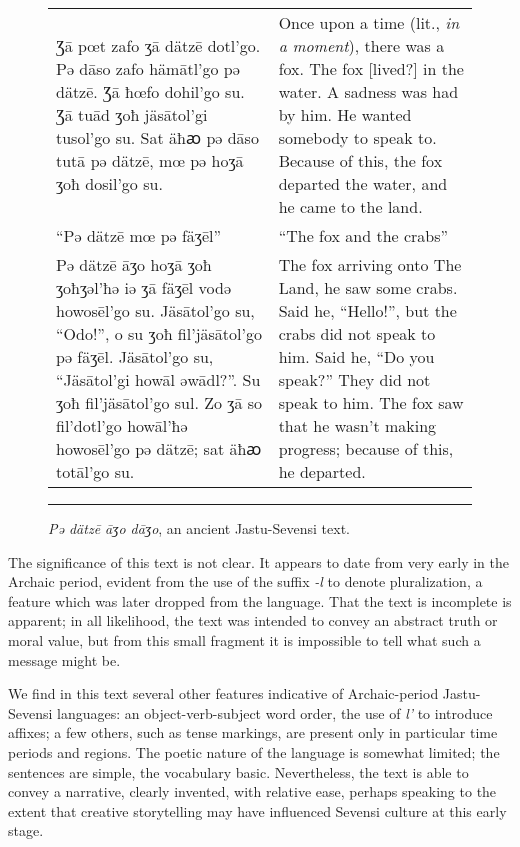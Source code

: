 \begin{figure}[ht]

\centering\small

\begin{tabular}{p{200pt}p{200pt}}
{\raggedleft Ʒā pœt zafo ʒā dätzē dotl’go.
Pǝ dāso zafo hämātl’go pǝ dätzē.
Ʒā ħœfo dohil'go su.
Ʒā tuād ʒoħ jäsātol’gi tusol’go su.
Sat äħꜵ pǝ dāso tutā pǝ dätzē, mœ pǝ hoʒā ʒoħ dosil’go su.\par}
&{\raggedright Once upon a time (lit., \emph{in a moment}), there was a fox.
The fox [lived?] in the water.
A sadness was had by him.
He wanted somebody to speak to.
Because of this, the fox departed the water, and he came to the land.\par}
\\{\raggedleft “Pə dätzē mœ pə fäʒēl”\par}
&{\raggedright “The fox and the crabs”\par}
\\{\raggedleft Pə dätzē āʒo hoʒā ʒoħ ʒoħʒəl'ħə iə ʒā fäʒēl vodə howosēl'go su.
Jäsātol'go su, “Odo!”, o su ʒoħ fil'jäsātol'go pə fäʒēl.
Jäsātol'go su, “Jäsātol'gi howāl əwādl?”.
Su ʒoħ fil'jäsātol'go sul.
Zo ʒā so fil'dotl'go howāl'ħə howosēl'go pə dätzē; sat äħꜵ totāl'go su.\par}
&{\raggedright The fox arriving onto The Land, he saw some crabs.
Said he, “Hello!”, but the crabs did not speak to him.
Said he, “Do you speak?”
They did not speak to him.
The fox saw that he wasn't making progress; because of this, he departed.\par}
\end{tabular}

\caption{\emph{Pə dätzē āʒo dāʒo}, an ancient Jastu-Sevensi text.}
\label{archaic-translation}

\medskip\hrule

\end{figure}

The significance of this text is not clear.
It appears to date from very early in the Archaic period, evident from the use of the suffix \emph{-l} to denote pluralization, a feature which was later dropped from the language.
That the text is incomplete is apparent; in all likelihood, the text was intended to convey an abstract truth or moral value, but from this small fragment it is impossible to tell what such a message might be.

We find in this text several other features indicative of Archaic-period Jastu-Sevensi languages: an object-verb-subject word order, the use of \emph{l'} to introduce affixes; a few others, such as tense markings, are present only in particular time periods and regions.
The poetic nature of the language is somewhat limited; the sentences are simple, the vocabulary basic.
Nevertheless, the text is able to convey a narrative, clearly invented, with relative ease, perhaps speaking to the extent that creative storytelling may have influenced Sevensi culture at this early stage.

